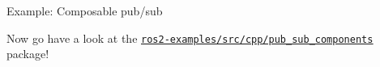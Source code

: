 \begin{frame}{Example: Composable pub/sub}
  \justifying
  \begin{block}{}
    \centering
	  Now go have a look at the \href{https://github.com/IntelligentSystemsLabUTV/ros2-examples/tree/jazzy/src/cpp/pub_sub_components}{\color{blue}\underline{\texttt{ros2-examples/src/cpp/pub\_sub\_components}}} package!
  \end{block}
\end{frame}
